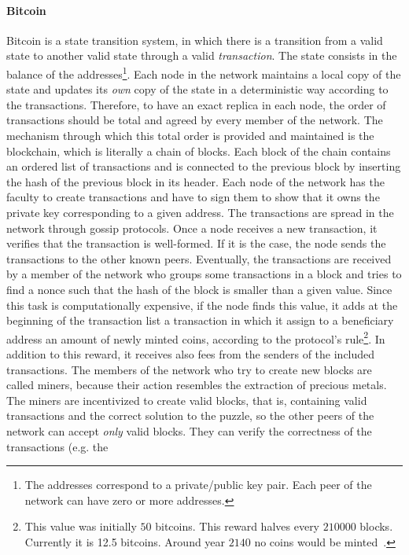 \paragraph{Bitcoin}
Bitcoin is a state transition system, in which there is a transition from a
valid state to another valid state through a valid \emph{transaction}. The state
consists in the balance of the addresses\footnote{The addresses correspond to a
private/public key pair. Each peer of the network can have zero or more
addresses.}. Each node in the network maintains a local copy of the state and
updates its \emph{own} copy of the state in a deterministic way according to the
transactions. Therefore, to have an exact replica in each node, the order of
transactions should be total and agreed by every member of the network. The
mechanism through which this total order is provided and maintained is the
blockchain, which is literally a chain of blocks. Each block of the chain
contains an ordered list of transactions and is connected to the previous block
by inserting the hash of the previous block in its header. Each node of the
network has the faculty to create transactions and have to sign them to show
that it owns the private key corresponding to a given address. The transactions
are spread in the network through gossip protocols. Once a node receives a new
transaction, it verifies that the transaction is well-formed. If it is the case,
the node sends the transactions to the other known peers. Eventually, the
transactions are received by a member of the network who groups some
transactions in a block and tries to find a nonce such that the hash of the
block is smaller than a given value. Since this task is computationally
expensive, if the node finds this value, it adds at the beginning of the
transaction list a transaction in which it assign to a beneficiary address an
amount of newly minted coins, according to the protocol's rule\footnote{This
value was initially $50$ bitcoins. This reward halves every $210000$ blocks.
Currently it is 12.5 bitcoins. Around year $2140$ no coins would be
minted~\cite{bib:masteringbitcoin}.}. In addition to this reward, it receives
also fees from the senders of the included transactions. The members of the
network who try to create new blocks are called miners, because their action
resembles the extraction of precious metals. The miners are incentivized to
create valid blocks, that is, containing valid transactions and the correct
solution to the puzzle, so the other peers of the network can accept \emph{only}
valid blocks. They can verify the correctness of the transactions (e.g. the
